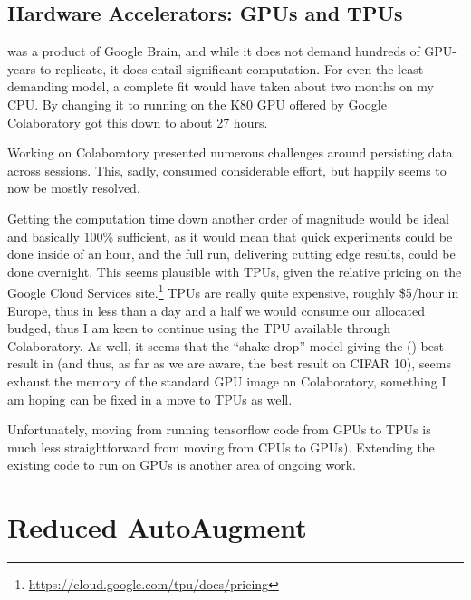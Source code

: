 \documentclass[10pt,twocolumn,letterpaper]{article}
\begin{document}
	\subsection{Hardware Accelerators: GPUs and TPUs}
		\cite{Cubuk2018} was a product of Google Brain, and while it does not demand hundreds of GPU-years to replicate, it does entail significant computation. For even the least-demanding model, a complete fit would have taken about two months on my CPU. By changing it to running on the K80 GPU offered by Google Colaboratory got this down to about 27 hours. 

		Working on Colaboratory presented numerous challenges around persisting data across sessions. This, sadly, consumed considerable effort, but happily seems to now be mostly resolved. 

		Getting the computation time down another order of magnitude would be ideal and basically 100\% sufficient, as it would mean that quick experiments could be done inside of an hour, and the full run, delivering cutting edge results, could be done overnight. This seems plausible with TPUs, given the relative pricing on the Google Cloud Services site.\footnote{\url{https://cloud.google.com/tpu/docs/pricing}} TPUs are really quite expensive, roughly \$5/hour in Europe, thus in less than a day and a half we would consume our allocated budged, thus I am keen to continue using the TPU available through Colaboratory. As well, it seems that the ``shake-drop'' model giving the (\cite{Yamada2018}) best result in \cite{Cubuk2018} (and thus, as far as we are aware, the best result on CIFAR 10), seems exhaust the memory of the standard GPU image on Colaboratory, something I am hoping can be fixed in a move to TPUs as well. 

		Unfortunately, moving from running tensorflow code from GPUs to TPUs is much less straightforward from moving from CPUs to GPUs). Extending the existing code to run on GPUs is another area of ongoing work.
	

\section{Reduced AutoAugment}
\end{document}
